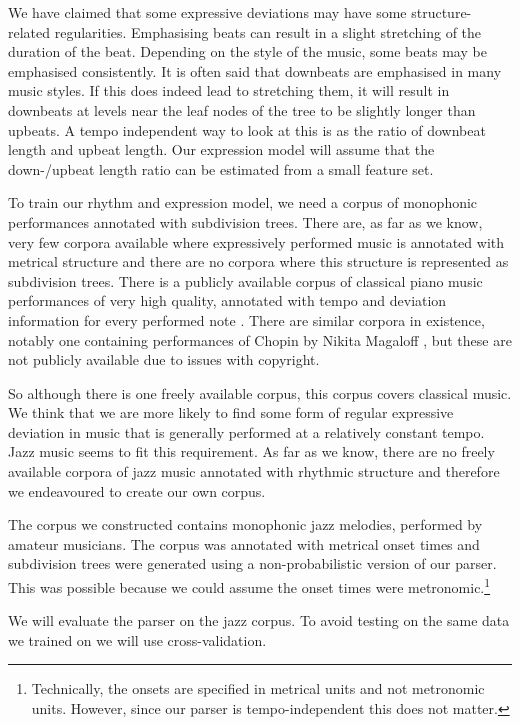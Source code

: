 We have claimed that some expressive deviations may have some structure-related regularities. Emphasising beats can result in a slight stretching of the duration of the beat. Depending on the style of the music, some beats may be emphasised consistently. It is often said that downbeats are emphasised in many music styles. If this does indeed lead to stretching them, it will result in downbeats at levels near the leaf nodes of the tree to be slightly longer than upbeats. A tempo independent way to look at this is as the ratio of downbeat length and upbeat length. Our expression model will assume that the down-/upbeat length ratio can be estimated from a small feature set.

To train our rhythm and expression model, we need a corpus of monophonic performances annotated with subdivision trees. There are, as far as we know, very few corpora available where expressively performed music is annotated with metrical structure and there are no corpora where this structure is represented as subdivision trees. There is a publicly available corpus of classical piano music performances of very high quality, annotated with tempo and deviation information for every performed note \citep{hashida2008new}. There are similar corpora in existence, notably one containing performances of Chopin by Nikita Magaloff \citep{flossmann2010magaloff}, but these are not publicly available due to issues with copyright. 

So although there is one freely available corpus, this corpus covers classical music. We think that we are more likely to find some form of regular expressive deviation in music that is generally performed at a relatively constant tempo. Jazz music seems to fit this requirement. As far as we know, there are no freely available corpora of jazz music annotated with rhythmic structure and therefore we endeavoured to create our own corpus.

The corpus we constructed contains monophonic jazz melodies, performed by amateur musicians. The corpus was annotated with metrical onset times and subdivision trees were generated using a non-probabilistic version of our parser. This was possible because we could assume the onset times were metronomic.\footnote{Technically, the onsets are specified in metrical units and not metronomic units. However, since our parser is tempo-independent this does not matter.}

We will evaluate the parser on the jazz corpus. To avoid testing on the same data we trained on we will use cross-validation.
